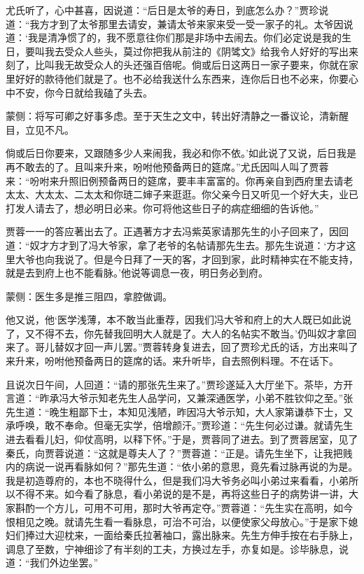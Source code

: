 \begin{parag}
    尤氏听了，心中甚喜，因说道：“后日是太爷的寿日，到底怎么办？”贾珍说道：“我方才到了太爷那里去请安，兼请太爷来家来受一受一家子的礼。太爷因说道：‘我是清净惯了的，我不愿意往你们那是非场中去闹去。你们必定说是我的生日，要叫我去受众人些头，莫过你把我从前注的《阴骘文》给我令人好好的写出来刻了，比叫我无故受众人的头还强百倍呢。倘或后日这两日一家子要来，你就在家里好好的款待他们就是了。也不必给我送什么东西来，连你后日也不必来，你要心中不安，你今日就给我磕了头去。\begin{note}蒙侧：将写可卿之好事多虑。至于天生之文中，转出好清静之一番议论，清新醒目，立见不凡。\end{note}倘或后日你要来，又跟随多少人来闹我，我必和你不依。’如此说了又说，后日我是再不敢去的了。且叫来升来，吩咐他预备两日的筵席。”尤氏因叫人叫了贾蓉来：“吩咐来升照旧例预备两日的筵席，要丰丰富富的。你再亲自到西府里去请老太太、大太太、二太太和你琏二婶子来逛逛。你父亲今日又听见一个好大夫，业已打发人请去了，想必明日必来。你可将他这些日子的病症细细的告诉他。”
\end{parag}


\begin{parag}
    贾蓉一一的答应著出去了。正遇著方才去冯紫英家请那先生的小子回来了，因回道：“奴才方才到了冯大爷家，拿了老爷的名帖请那先生去。那先生说道：‘方才这里大爷也向我说了。但是今日拜了一天的客，才回到家，此时精神实在不能支持，就是去到府上也不能看脉。’他说等调息一夜，明日务必到府。\begin{note}蒙侧：医生多是推三阻四，拿腔做调。\end{note}他又说，他‘医学浅薄，本不敢当此重荐，因我们冯大爷和府上的大人既已如此说了，又不得不去，你先替我回明大人就是了。大人的名帖实不敢当。’仍叫奴才拿回来了。哥儿替奴才回一声儿罢。”贾蓉转身复进去，回了贾珍尤氏的话，方出来叫了来升来，吩咐他预备两日的筵席的话。来升听毕，自去照例料理。不在话下。
\end{parag}


\begin{parag}
    且说次日午间，人回道：“请的那张先生来了。”贾珍遂延入大厅坐下。茶毕，方开言道：“昨承冯大爷示知老先生人品学问，又兼深通医学，小弟不胜钦仰之至。”张先生道：“晚生粗鄙下士，本知见浅陋，昨因冯大爷示知，大人家第谦恭下士，又承呼唤，敢不奉命。但毫无实学，倍增颜汗。”贾珍道：“先生何必过谦。就请先生进去看看儿妇，仰仗高明，以释下怀。”于是，贾蓉同了进去。到了贾蓉居室，见了秦氏，向贾蓉说道：“这就是尊夫人了？”贾蓉道：“正是。请先生坐下，让我把贱内的病说一说再看脉如何？”那先生道：“依小弟的意思，竟先看过脉再说的为是。我是初造尊府的，本也不晓得什么，但是我们冯大爷务必叫小弟过来看看，小弟所以不得不来。如今看了脉息，看小弟说的是不是，再将这些日子的病势讲一讲，大家斟酌一个方儿，可用不可用，那时大爷再定夺。”贾蓉道：“先生实在高明，如今恨相见之晚。就请先生看一看脉息，可治不可治，以便使家父母放心。”于是家下媳妇们捧过大迎枕来，一面给秦氏拉著袖口，露出脉来。先生方伸手按在右手脉上，调息了至数，宁神细诊了有半刻的工夫，方换过左手，亦复如是。诊毕脉息，说道：“我们外边坐罢。”
\end{parag}


